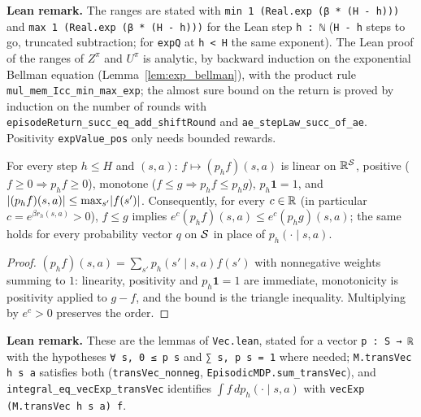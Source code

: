 \textbf{Lean remark.} The ranges are stated with \texttt{min 1 (Real.exp (β * (H - h)))} and
\texttt{max 1 (Real.exp (β * (H - h)))} for the Lean step \texttt{h : ℕ} (\texttt{H - h} steps to
go, truncated subtraction; for \texttt{expQ} at \texttt{h < H} the same exponent). The
Lean proof of the ranges of $Z^\pi$ and $U^\pi$ is analytic, by backward induction on the
exponential Bellman equation (Lemma~\ref{lem:exp_bellman}), with the product rule
\texttt{mul\_mem\_Icc\_min\_max\_exp}; the almost sure bound on the return is proved by
induction on the number of rounds with \texttt{episodeReturn\_succ\_eq\_add\_shiftRound} and
\texttt{ae\_stepLaw\_succ\_of\_ae}. Positivity \texttt{expValue\_pos} only needs bounded rewards.

\begin{lemma}\label{lem:exp_value_monotone}
\leanok
{}
For every step $h \le H$ and $(s, a)$: $f \mapsto (p_h f)(s, a)$ is linear on $\mathbb{R}^{\mathcal{S}}$,
positive ($f \ge 0 \Rightarrow p_h f \ge 0$), monotone ($f \le g \Rightarrow p_h f \le p_h g$),
$p_h \mathbf 1 = 1$, and $\lvert (p_h f)(s, a) \rvert \le \max_{s'} \lvert f(s') \rvert$. Consequently, for every
$c \in \mathbb{R}$ (in particular $c = e^{\beta r_h(s, a)} > 0$), $f \le g$ implies
$e^{c}(p_h f)(s, a) \le e^{c}(p_h g)(s, a)$; the same holds for every probability vector $q$ on
$\mathcal{S}$ in place of $p_h(\cdot \mid s, a)$.
\end{lemma}

\begin{proof}
\leanok
$(p_h f)(s, a) = \sum_{s'} p_h(s' \mid s, a) f(s')$ with nonnegative weights summing to $1$:
linearity, positivity and $p_h \mathbf 1 = 1$ are immediate, monotonicity is positivity applied
to $g - f$, and the bound is the triangle inequality. Multiplying by $e^c > 0$ preserves the
order.
\end{proof}

\textbf{Lean remark.} These are the lemmas of \texttt{Vec.lean}, stated for a vector
\texttt{p : S → ℝ} with the hypotheses \texttt{∀ s, 0 ≤ p s} and \texttt{∑ s, p s = 1} where
needed; \texttt{M.transVec h s a} satisfies both (\texttt{transVec\_nonneg},
\texttt{EpisodicMDP.sum\_transVec}), and \texttt{integral\_eq\_vecExp\_transVec} identifies
$\int f\,dp_h(\cdot \mid s, a)$ with \texttt{vecExp (M.transVec h s a) f}.

